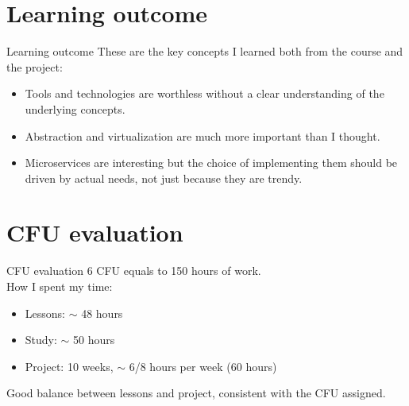 \documentclass{beamer}
\begin{document}
\section{Learning outcome}
\begin{frame}{Learning outcome}
	These are the key concepts I learned both from the course and the project:
	\begin{itemize}
		\item Tools and technologies are worthless without a clear understanding of the underlying concepts.
		\item Abstraction and virtualization are much more important than I thought. %
		\item Microservices are interesting but the choice of implementing them should be driven by actual needs, not just because they are trendy.
	\end{itemize}
\end{frame}
\section{CFU evaluation}
\begin{frame}{CFU evaluation}
	6 CFU equals to 150 hours of work.
	\\
	How I spent my time:
	\begin{itemize}
		\item Lessons: $\sim$ 48 hours
		\item Study: $\sim$ 50 hours
		\item Project: 10 weeks, $\sim$ 6/8 hours per week (60 hours)
	\end{itemize}
	\begin{block}{}
		Good balance between lessons and project, consistent with the CFU assigned.
	\end{block}
\end{frame}
\end{document}
